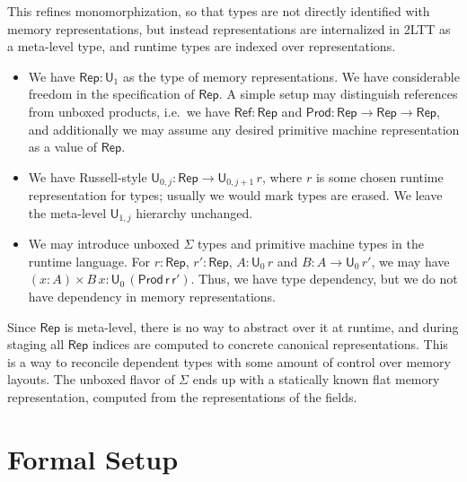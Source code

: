 \documentclass[acmsmall,anonymous,review]{acmart}
\newcommand{\msf}[1]{\mathsf{#1}}
\renewcommand{\U}{\msf{U}}
\newcommand{\Nat}{\msf{Nat}}
\newcommand{\Rep}{\msf{Rep}}
\theoremstyle{remark}
\begin{document}
This refines monomorphization, so that types are not directly identified with
memory representations, but instead representations are internalized in 2LTT as
a meta-level type, and runtime types are indexed over representations.
\begin{itemize}
\item We have $\Rep : \U_1$ as the type of memory representations. We have
  considerable freedom in the specification of $\Rep$. A simple setup may
  distinguish references from unboxed products, i.e.\ we have $\msf{Ref} : \Rep$
  and $\msf{Prod} : \Rep \to \Rep \to \Rep$, and additionally we may assume
  any desired primitive machine representation as a value of $\Rep$.
\item We have Russell-style $\U_{0,j} : \Rep \to \U_{0, j+1}\,r$, where $r$ is
  some chosen runtime representation for types; usually we would mark types are
  erased. We leave the meta-level $\U_{1,j}$ hierarchy unchanged.
\item We may introduce unboxed $\Sigma$ types and primitive machine types in the
  runtime language. For $r : \Rep$, $r' : \Rep$, $A : \U_{0}\,r$ and $B : A \to
  \U_{0}\,r'$, we may have $(x : A) \times B\,x :
  \U_{0}\,(\msf{Prod\,r\,r'})$. Thus, we have type dependency, but we do not
  have dependency in memory representations.
\end{itemize}
Since $\Rep$ is meta-level, there is no way to abstract over it at runtime, and
during staging all $\Rep$ indices are computed to concrete canonical
representations. This is a way to reconcile dependent types with some amount of
control over memory layouts. The unboxed flavor of $\Sigma$ ends up with a
statically known flat memory representation, computed from the representations
of the fields.


\section{Formal Setup}\label{sec:formal-2ltt}
\end{document}
